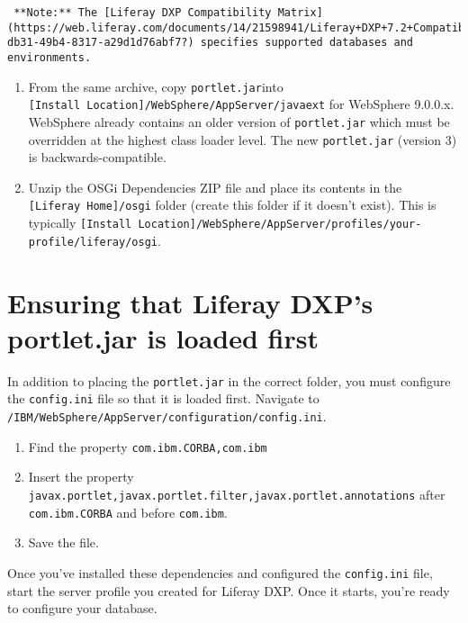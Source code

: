 \noindent\hrulefill

\begin{verbatim}
 **Note:** The [Liferay DXP Compatibility Matrix](https://web.liferay.com/documents/14/21598941/Liferay+DXP+7.2+Compatibility+Matrix/b6e0f064-db31-49b4-8317-a29d1d76abf7?) specifies supported databases and environments.
\end{verbatim}

\noindent\hrulefill

\begin{enumerate}
\def\labelenumi{\arabic{enumi}.}
\setcounter{enumi}{1}
\item
  From the same archive, copy \texttt{portlet.jar}into
  \texttt{{[}Install\ Location{]}/WebSphere/AppServer/javaext} for
  WebSphere 9.0.0.x. WebSphere already contains an older version of
  \texttt{portlet.jar} which must be overridden at the highest class
  loader level. The new \texttt{portlet.jar} (version 3) is
  backwards-compatible.
\item
  Unzip the OSGi Dependencies ZIP file and place its contents in the
  \texttt{{[}Liferay\ Home{]}/osgi} folder (create this folder if it
  doesn't exist). This is typically
  \texttt{{[}Install\ Location{]}/WebSphere/AppServer/profiles/your-profile/liferay/osgi}.
\end{enumerate}

\section{Ensuring that Liferay DXP's portlet.jar is loaded
first}\label{ensuring-that-liferay-dxps-portlet.jar-is-loaded-first}

In addition to placing the \texttt{portlet.jar} in the correct folder,
you must configure the \texttt{config.ini} file so that it is loaded
first. Navigate to
\texttt{/IBM/WebSphere/AppServer/configuration/config.ini}.

\begin{enumerate}
\def\labelenumi{\arabic{enumi}.}
\item
  Find the property \texttt{com.ibm.CORBA,com.ibm}
\item
  Insert the property
  \texttt{javax.portlet,javax.portlet.filter,javax.portlet.annotations}
  after \texttt{com.ibm.CORBA} and before \texttt{com.ibm}.
\item
  Save the file.
\end{enumerate}

Once you've installed these dependencies and configured the
\texttt{config.ini} file, start the server profile you created for
Liferay DXP. Once it starts, you're ready to configure your database.

